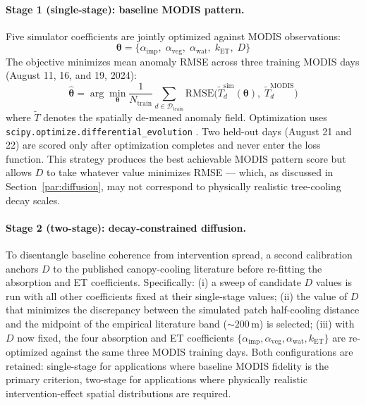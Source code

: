 \documentclass[12pt, letterpaper]{article}
\begin{document}
\paragraph{Stage 1 (single-stage): baseline MODIS pattern.}
Five simulator coefficients are jointly optimized against MODIS observations:
\begin{equation}
  \boldsymbol{\theta} = \{
    \alpha_{\mathrm{imp}},\;
    \alpha_{\mathrm{veg}},\;
    \alpha_{\mathrm{wat}},\;
    k_{\mathrm{ET}},\;
    D
  \}
\end{equation}
The objective minimizes mean anomaly RMSE across three training MODIS days
(August 11, 16, and 19, 2024):
\begin{equation}
  \hat{\boldsymbol{\theta}} = \arg\min_{\boldsymbol{\theta}}
  \frac{1}{N_{\mathrm{train}}} \sum_{d \in \mathcal{D}_{\mathrm{train}}}
  \mathrm{RMSE}\bigl(
    \tilde{T}^{\mathrm{sim}}_d(\boldsymbol{\theta}),\;
    \tilde{T}^{\mathrm{MODIS}}_d
  \bigr)
\end{equation}
where $\tilde{T}$ denotes the spatially de-meaned anomaly field.
Optimization uses \texttt{scipy.optimize.differential\_evolution}
\citep{storn1997differential}. Two held-out days (August 21 and 22) are
scored only after optimization completes and never enter the loss function.
This strategy produces the best achievable MODIS pattern score but allows $D$
to take whatever value minimizes RMSE — which, as discussed in
Section~\ref{par:diffusion}, may not correspond to physically realistic
tree-cooling decay scales.

\paragraph{Stage 2 (two-stage): decay-constrained diffusion.}
To disentangle baseline coherence from intervention spread, a second
calibration anchors $D$ to the published canopy-cooling literature before
re-fitting the absorption and ET coefficients. Specifically: (i) a sweep
of candidate $D$ values is run with all other coefficients fixed at their
single-stage values; (ii) the value of $D$ that minimizes the discrepancy
between the simulated patch half-cooling distance and the midpoint of the
empirical literature band ($\sim$$200\,\text{m}$) is selected; (iii) with
$D$ now fixed, the four absorption and ET coefficients
$\{\alpha_{\mathrm{imp}}, \alpha_{\mathrm{veg}}, \alpha_{\mathrm{wat}},
k_{\mathrm{ET}}\}$ are re-optimized against the same three MODIS training
days. Both configurations are retained: single-stage for applications
where baseline MODIS fidelity is the primary criterion, two-stage for
applications where physically realistic intervention-effect spatial
distributions are required.
\end{document}
